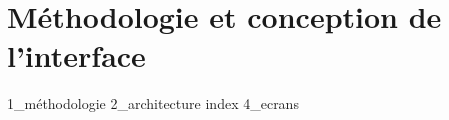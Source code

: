 \section{Méthodologie et conception de l'interface}

{1_méthodologie}
{2_architecture}
{index}
{4_ecrans}